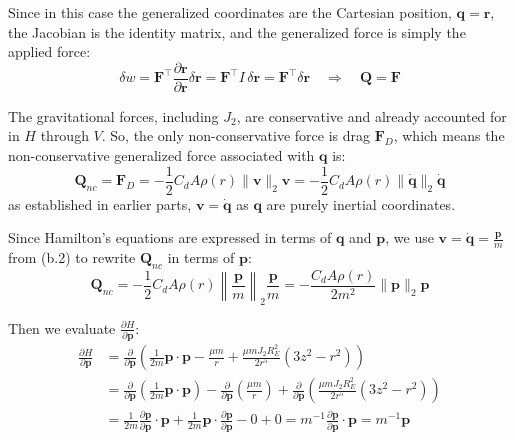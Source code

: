 \documentclass[titlepage]{article}
\begin{document}
Since in this case the generalized coordinates are the Cartesian position, $\boldsymbol{q}=\boldsymbol{r}$, the Jacobian is the identity matrix, and the generalized force is simply the applied force:
\begin{equation}
	\delta w=\boldsymbol{F}^\top \frac{\partial\boldsymbol{r}}{\partial\boldsymbol{r}}\delta\boldsymbol{r}=\boldsymbol{F}^\top I\,\delta\boldsymbol{r}=\boldsymbol{F}^\top\delta\boldsymbol{r}\quad\Rightarrow\quad\boldsymbol{Q}=\boldsymbol{F}
\end{equation}

The gravitational forces, including $J_2$, are conservative and already accounted for in $H$ through $V$. So, the only non-conservative force is drag $\boldsymbol{F}_D$, which means the non-conservative generalized force associated with $\boldsymbol{q}$ is:
\begin{equation}
	\boldsymbol{Q}_{nc}=\boldsymbol{F}_D=-\frac{1}{2}C_dA\rho(r)\|\boldsymbol{v}\|_2\boldsymbol{v}=-\frac{1}{2}C_dA\rho(r)\|\dot{\boldsymbol{q}}\|_2\dot{\boldsymbol{q}}
\end{equation}
as established in earlier parts, $\boldsymbol{v}=\dot{\boldsymbol{q}}$ as $\boldsymbol{q}$ are purely inertial coordinates.

Since Hamilton's equations are expressed in terms of $\boldsymbol{q}$ and $\boldsymbol{p}$, we use $\boldsymbol{v}=\dot{\boldsymbol{q}}=\frac{\boldsymbol{p}}{m}$ from (b.2) to rewrite $\boldsymbol{Q}_{nc}$ in terms of $\boldsymbol{p}$:
\begin{equation}
	\boldsymbol{Q}_{nc}=-\frac{1}{2}C_dA\rho(r)\left\|\frac{\boldsymbol{p}}{m}\right\|_2\frac{\boldsymbol{p}}{m}=-\frac{C_dA\rho(r)}{2m^2}\|\boldsymbol{p}\|_2\boldsymbol{p}
	\label{eq:genforcemomentum}
\end{equation}

Then we evaluate $\frac{\partial H}{\partial\boldsymbol{p}}$:
\begin{equation}
	\begin{split}
		\frac{\partial H}{\partial\boldsymbol{p}}&=\frac{\partial}{\partial\boldsymbol{p}}\left(\frac{1}{2m}\boldsymbol{p}\cdot\boldsymbol{p}-\frac{\mu m}{r}+\frac{\mu mJ_2R_E^2}{2r^5}\left(3z^2-r^2\right) \right) \\
		&=\frac{\partial}{\partial\boldsymbol{p}}\left(\frac{1}{2m}\boldsymbol{p}\cdot\boldsymbol{p}\right)-\frac{\partial}{\partial\boldsymbol{p}}\left(\frac{\mu m}{r}\right)+\frac{\partial}{\partial\boldsymbol{p}}\left(\frac{\mu mJ_2R_E^2}{2r^5}\left(3z^2-r^2\right)\right) \\
		&=\frac{1}{2m}\frac{\partial\boldsymbol{p}}{\partial\boldsymbol{p}}\cdot\boldsymbol{p}+\frac{1}{2m}\boldsymbol{p}\cdot\frac{\partial\boldsymbol{p}}{\partial\boldsymbol{p}}-0+0=m^{-1}\frac{\partial\boldsymbol{p}}{\partial\boldsymbol{p}}\cdot\boldsymbol{p}=m^{-1}\boldsymbol{p}
	\end{split}
	\label{eq:coordianterate}
\end{equation}
\end{document}
